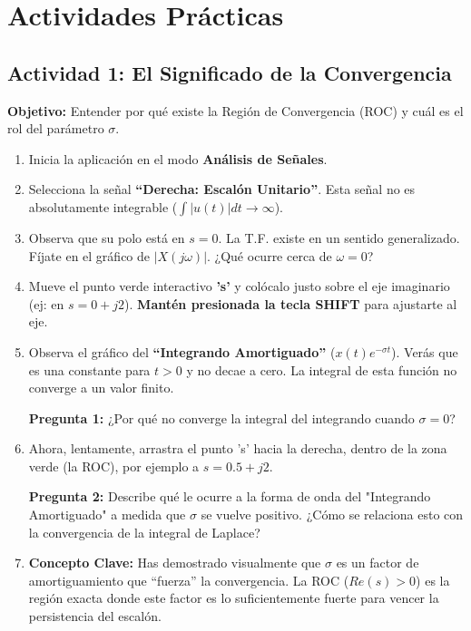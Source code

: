 \documentclass[12pt, a4paper]{article}
\begin{document}
\section{Actividades Prácticas}

\begin{framed}
\subsection*{Actividad 1: El Significado de la Convergencia}
\textbf{Objetivo:} Entender por qué existe la Región de Convergencia (ROC) y cuál es el rol del parámetro $\sigma$.

\begin{enumerate}[label=\textbf{\arabic*.}]
    \item Inicia la aplicación en el modo \textbf{Análisis de Señales}.
    \item Selecciona la señal \textbf{``Derecha: Escalón Unitario''}. Esta señal no es absolutamente integrable ($\int |u(t)|dt \to \infty$).
    \item Observa que su polo está en $s=0$. La T.F. existe en un sentido generalizado. Fíjate en el gráfico de $|X(j\omega)|$. ¿Qué ocurre cerca de $\omega=0$?
    \item Mueve el punto verde interactivo \textbf{'s'} y colócalo justo sobre el eje imaginario (ej: en $s = 0 + j2$). \textbf{Mantén presionada la tecla SHIFT} para ajustarte al eje.
    \item Observa el gráfico del \textbf{``Integrando Amortiguado''} ($x(t)e^{-\sigma t}$). Verás que es una constante para $t>0$ y no decae a cero. La integral de esta función no converge a un valor finito.
    
    \textbf{Pregunta 1:} ¿Por qué no converge la integral del integrando cuando $\sigma=0$?
    
    \vspace{2cm} 
    
    \item Ahora, lentamente, arrastra el punto 's' hacia la derecha, dentro de la zona verde (la ROC), por ejemplo a $s = 0.5 + j2$.
    
    \textbf{Pregunta 2:} Describe qué le ocurre a la forma de onda del "Integrando Amortiguado" a medida que $\sigma$ se vuelve positivo. ¿Cómo se relaciona esto con la convergencia de la integral de Laplace?
    
    \vspace{2cm}
    
    \item \textbf{Concepto Clave:} Has demostrado visualmente que $\sigma$ es un factor de amortiguamiento que ``fuerza'' la convergencia. La ROC ($Re(s)>0$) es la región exacta donde este factor es lo suficientemente fuerte para vencer la persistencia del escalón.
\end{enumerate}
\end{framed}
\end{document}
